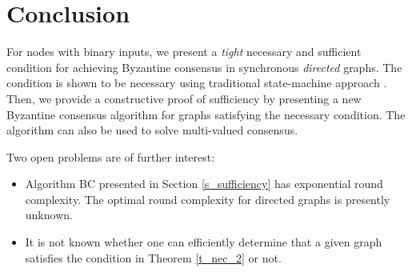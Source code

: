 \documentclass[letterpaper, 11pt]{article}
\begin{document}
\section{Conclusion}
\label{s_conclusion}

For nodes with binary inputs, we present a {\em tight} necessary and sufficient condition for achieving Byzantine consensus in synchronous {\em directed} graphs. The condition is shown to be necessary using traditional state-machine approach \cite{impossible_proof_lynch,dolev_82_BG, welch_book}. Then, we provide a constructive proof of sufficiency by presenting a new Byzantine consensus algorithm for graphs satisfying the necessary condition. The algorithm can also be used to solve multi-valued consensus.

Two open problems are of further interest: 

\begin{itemize}
\item  Algorithm BC presented in Section \ref{s_sufficiency} has exponential round complexity. The optimal round complexity for directed graphs is presently unknown.

\item It is not known whether one can efficiently determine that a given graph satisfies the condition in Theorem \ref{t_nec_2} or not. 


\end{itemize}
\end{document}
